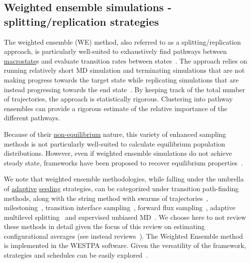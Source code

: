 \documentclass[9pt,review]{livecoms}
\begin{document}
\subsection{Weighted ensemble simulations - splitting/replication strategies}

The weighted ensemble (WE) method, also referred to as a splitting/replication approach, is particularly well-suited to exhaustively find pathways between \hyperlink{ref:Macrostate} {macrostate}s and evaluate transition rates between states~\cite{HUBER199697}. The approach relies on running relatively short MD simulation and terminating simulations that are not making progress towards the target state while replicating simulations that are instead progressing towards the end state~\cite{doi:10.1146/annurev-biophys-070816-033834}. By keeping track of the total number of trajectories, the approach is statistically rigorous. Clustering into pathway ensembles can provide a rigorous estimate of the relative importance of the different pathways.

Because of their \hyperlink{ref:OutOfEq} {non-equilibrium} nature, this variety of enhanced sampling methods is not particularly well-suited to calculate equilibrium population distributions. However, even if weighted ensemble simulations do not achieve steady state, frameworks have been proposed to recover equilibrium properties~\cite{doi:10.1063/1.3456985,doi:10.1021/ct401065r,doi:10.1021/jacs.8b10735}.

We note that weighted ensemble methodologies, while falling under the umbrella of \hyperlink{ref:Adaptive} {adaptive} \hyperlink{ref:Seeding} {seeding} strategies, can be categorized under transition path-finding methods, along with the string method with swarms of trajectories~\cite{doi:10.1021/jp0777059}, milestoning~\cite{doi:10.1063/1.1738640}, transition interface sampling~\cite{doi:10.1063/1.1562614}, forward flux sampling~\cite{PhysRevLett.94.018104}, adaptive multilevel splitting~\cite{cerou-guyader-lelievre-pommier-11,teo-mayne-schulten-lelievre-16} and supervised unbiased MD~\cite{doi:10.1021/acs.jcim.9b01094, doi:10.1021/acs.jcim.5b00702}. We choose here to not review these methods in detail given the focus of this review on estimating configurational averages (see instead reviews~\cite{doi:10.1146/annurev.physchem.040808.090412, doi:10.1146/annurev.physchem.53.082301.113146, doi:10.1063/1.5127780}).
The Weighted Ensemble method is implemented in the WESTPA software. Given the versatility of the framework, strategies and schedules can be easily explored~\cite{Bogetti2019Suite}.
\end{document}
